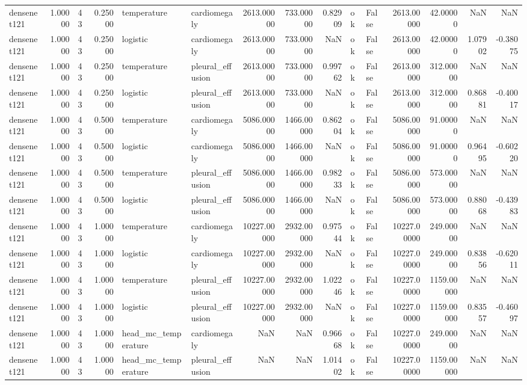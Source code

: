 \begin{tabular}{lrlrllrrrllrrrr}
densenet121 & 1.00000 & 43 & 0.25000 & temperature & cardiomegaly & 2613.00000 & 733.00000 & 0.82909 & ok & False & 2613.00000 & 42.00000 & NaN & NaN \\
densenet121 & 1.00000 & 43 & 0.25000 & logistic & cardiomegaly & 2613.00000 & 733.00000 & NaN & ok & False & 2613.00000 & 42.00000 & 1.07902 & -0.38075 \\
densenet121 & 1.00000 & 43 & 0.25000 & temperature & pleural\_effusion & 2613.00000 & 733.00000 & 0.99762 & ok & False & 2613.00000 & 312.00000 & NaN & NaN \\
densenet121 & 1.00000 & 43 & 0.25000 & logistic & pleural\_effusion & 2613.00000 & 733.00000 & NaN & ok & False & 2613.00000 & 312.00000 & 0.86881 & -0.40017 \\
densenet121 & 1.00000 & 43 & 0.50000 & temperature & cardiomegaly & 5086.00000 & 1466.00000 & 0.86204 & ok & False & 5086.00000 & 91.00000 & NaN & NaN \\
densenet121 & 1.00000 & 43 & 0.50000 & logistic & cardiomegaly & 5086.00000 & 1466.00000 & NaN & ok & False & 5086.00000 & 91.00000 & 0.96495 & -0.60220 \\
densenet121 & 1.00000 & 43 & 0.50000 & temperature & pleural\_effusion & 5086.00000 & 1466.00000 & 0.98233 & ok & False & 5086.00000 & 573.00000 & NaN & NaN \\
densenet121 & 1.00000 & 43 & 0.50000 & logistic & pleural\_effusion & 5086.00000 & 1466.00000 & NaN & ok & False & 5086.00000 & 573.00000 & 0.88068 & -0.43983 \\
densenet121 & 1.00000 & 43 & 1.00000 & temperature & cardiomegaly & 10227.00000 & 2932.00000 & 0.97544 & ok & False & 10227.00000 & 249.00000 & NaN & NaN \\
densenet121 & 1.00000 & 43 & 1.00000 & logistic & cardiomegaly & 10227.00000 & 2932.00000 & NaN & ok & False & 10227.00000 & 249.00000 & 0.83856 & -0.62011 \\
densenet121 & 1.00000 & 43 & 1.00000 & temperature & pleural\_effusion & 10227.00000 & 2932.00000 & 1.02246 & ok & False & 10227.00000 & 1159.00000 & NaN & NaN \\
densenet121 & 1.00000 & 43 & 1.00000 & logistic & pleural\_effusion & 10227.00000 & 2932.00000 & NaN & ok & False & 10227.00000 & 1159.00000 & 0.83557 & -0.46097 \\
densenet121 & 1.00000 & 43 & 1.00000 & head\_mc\_temperature & cardiomegaly & NaN & NaN & 0.96668 & ok & False & 10227.00000 & 249.00000 & NaN & NaN \\
densenet121 & 1.00000 & 43 & 1.00000 & head\_mc\_temperature & pleural\_effusion & NaN & NaN & 1.01402 & ok & False & 10227.00000 & 1159.00000 & NaN & NaN \\

\end{tabular}
